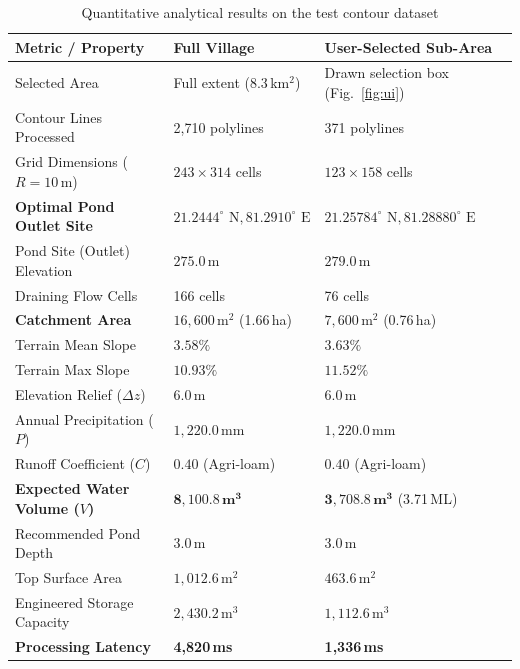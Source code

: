 \documentclass[manuscript,screen,review]{acmart}
\begin{document}
\begin{table}[!ht]
\small
  \caption{Quantitative analytical results on the test contour dataset}
  \label{tab:results}
  \begin{tabular}{p{5.5cm}p{3.5cm}p{3.5cm}}
    \toprule
    \textbf{Metric / Property} & \textbf{Full Village} & \textbf{User-Selected Sub-Area} \\
    \midrule
    Selected Area & Full extent (8.3\,km$^2$) & Drawn selection box (Fig.~\ref{fig:ui}) \\
    Contour Lines Processed & 2,710 polylines & 371 polylines \\
    Grid Dimensions ($R = 10\,\text{m}$) & $243 \times 314$ cells & $123 \times 158$ cells \\
    \textbf{Optimal Pond Outlet Site} & $21.2444^\circ\text{ N}, 81.2910^\circ\text{ E}$ & $21.25784^\circ\text{ N}, 81.28880^\circ\text{ E}$ \\
    Pond Site (Outlet) Elevation & $275.0\,\text{m}$ & $279.0\,\text{m}$ \\
    Draining Flow Cells & 166 cells & 76 cells \\
    \textbf{Catchment Area} & $16,600\,\text{m}^2$ (1.66\,ha) & $7,600\,\text{m}^2$ (0.76\,ha) \\
    Terrain Mean Slope & $3.58\%$ & $3.63\%$ \\
    Terrain Max Slope & $10.93\%$ & $11.52\%$ \\
    Elevation Relief ($\Delta z$) & $6.0\,\text{m}$ & $6.0\,\text{m}$ \\
    Annual Precipitation ($P$) & $1,220.0\,\text{mm}$ & $1,220.0\,\text{mm}$ \\
    Runoff Coefficient ($C$) & $0.40$ (Agri-loam) & $0.40$ (Agri-loam) \\
    \textbf{Expected Water Volume ($V$)} & $\mathbf{8,100.8\,\text{m}^3}$ & $\mathbf{3,708.8\,\text{m}^3}$ (3.71\,ML) \\
    Recommended Pond Depth & $3.0\,\text{m}$ & $3.0\,\text{m}$ \\
    Top Surface Area & $1,012.6\,\text{m}^2$ & $463.6\,\text{m}^2$ \\
    Engineered Storage Capacity & $2,430.2\,\text{m}^3$ & $1,112.6\,\text{m}^3$ \\
    \textbf{Processing Latency} & \textbf{4,820\,ms} & \textbf{1,336\,ms} \\
    \bottomrule
  \end{tabular}
\end{table}
\end{document}
